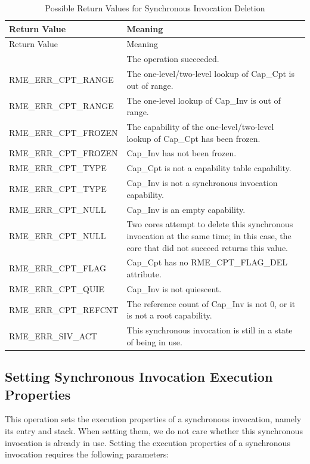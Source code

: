 \begin{xltabular}{\textwidth}{@{}>{\hsize\raggedright\arraybackslash}X>{\hsize\raggedright\arraybackslash}X@{}}
\caption{Possible Return Values for Synchronous Invocation Deletion}\label{tab:5-7-delete-sync-invocation-return-values}\\
\toprule
Return Value & Meaning\tabularnewline
\endfirsthead
\toprule
Return Value & Meaning\tabularnewline
\midrule
\endhead
\bottomrule
{} & The operation succeeded.\tabularnewline
    RME\_ERR\_CPT\_RANGE & The one-level/two-level lookup of Cap\_Cpt is out of range.\tabularnewline
    RME\_ERR\_CPT\_RANGE & The one-level lookup of Cap\_Inv is out of range.\tabularnewline
    RME\_ERR\_CPT\_FROZEN & The capability of the one-level/two-level lookup of Cap\_Cpt has been frozen.\tabularnewline
    RME\_ERR\_CPT\_FROZEN & Cap\_Inv has not been frozen.\tabularnewline
    RME\_ERR\_CPT\_TYPE & Cap\_Cpt is not a capability table capability.\tabularnewline
    RME\_ERR\_CPT\_TYPE & Cap\_Inv is not a synchronous invocation capability.\tabularnewline
    RME\_ERR\_CPT\_NULL & Cap\_Inv is an empty capability.\tabularnewline
    RME\_ERR\_CPT\_NULL & Two cores attempt to delete this synchronous invocation at the same time; in this case, the core that did not succeed returns this value.\tabularnewline
    RME\_ERR\_CPT\_FLAG & Cap\_Cpt has no RME\_CPT\_FLAG\_DEL attribute.\tabularnewline
    RME\_ERR\_CPT\_QUIE & Cap\_Inv is not quiescent.\tabularnewline
    RME\_ERR\_CPT\_REFCNT & The reference count of Cap\_Inv is not 0, or it is not a root capability.\tabularnewline
    RME\_ERR\_SIV\_ACT & This synchronous invocation is still in a state of being in use.\tabularnewline
\bottomrule
\end{xltabular}
\nopagebreak[4]

\subsection{Setting Synchronous Invocation Execution Properties}\label{subsec:5-set-sync-invocation-properties}

This operation sets the execution properties of a synchronous invocation, namely its entry and stack. When setting them, we do not care whether this synchronous invocation is already in use. Setting the execution properties of a synchronous invocation requires the following parameters:

